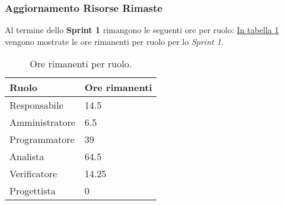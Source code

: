 \subsubsection{Aggiornamento Risorse Rimaste}
Al termine dello \textbf{Sprint 1} rimangono le seguenti ore per ruolo: \hyperref[tab:sprint1_ore_rimanenti]{In tabella \ref{tab:sprint1_ore_rimanenti}} vengono mostrate le ore rimanenti per ruolo per lo \textit{Sprint 1}.

\begin{table}[H]
    \centering
    \begin{tabular}{| l | l |}
    \hline
    \textbf{Ruolo} & 
    \textbf{Ore rimanenti}\\
    \hline
        Responsabile & 14.5\\
    \hline
        Amministratore & 6.5\\
    \hline
        Programmatore & 39\\
    \hline
        Analista & 64.5 \\
    \hline
        Verificatore & 14.25 \\
    \hline
        Progettista & 0 \\
    \hline
    \end{tabular}
    \caption{Ore rimanenti per ruolo.}
    \label{tab:sprint1_ore_rimanenti} 
\end{table}